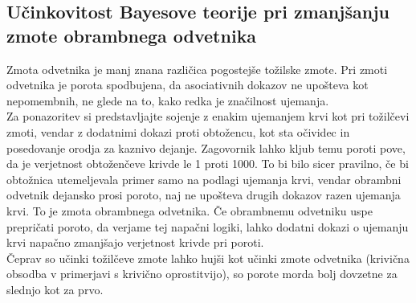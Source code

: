 \documentclass[12pt,a4paper]{amsart}
\theoremstyle{definition} %
\theoremstyle{plain} %
\begin{document}
\subsection{Učinkovitost Bayesove teorije pri zmanjšanju zmote obrambnega odvetnika}
Zmota odvetnika je manj znana različica pogostejše tožilske zmote. Pri zmoti odvetnika je porota spodbujena, da asociativnih dokazov ne upošteva 
kot nepomembnih, ne glede na to, kako redka je značilnost ujemanja.\\
Za ponazoritev si predstavljajte sojenje z enakim ujemanjem krvi kot pri tožilčevi zmoti, vendar z dodatnimi dokazi proti obtožencu, kot sta 
očividec in posedovanje orodja za kaznivo dejanje. Zagovornik lahko kljub temu poroti pove, da je verjetnost obtoženčeve krivde le 1 proti 1000. 
To bi bilo sicer pravilno, če bi obtožnica utemeljevala primer samo na podlagi ujemanja krvi, vendar obrambni odvetnik dejansko prosi poroto, 
naj ne upošteva drugih dokazov razen ujemanja krvi. To je zmota obrambnega odvetnika. Če obrambnemu odvetniku uspe prepričati poroto, da verjame 
tej napačni logiki, lahko dodatni dokazi o ujemanju krvi napačno zmanjšajo verjetnost krivde pri poroti.\\
Čeprav so učinki tožilčeve zmote lahko hujši kot učinki zmote odvetnika (krivična obsodba v primerjavi s krivično oprostitvijo), so porote morda 
bolj dovzetne za slednjo kot za prvo. 

\end{document}
